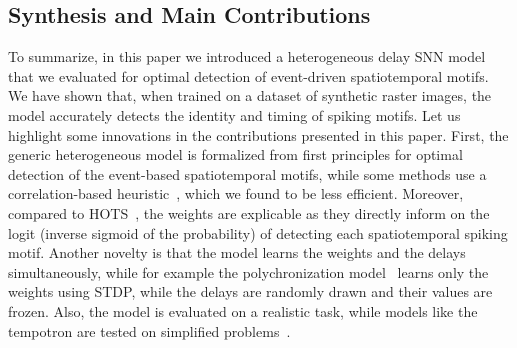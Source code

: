 \documentclass[runningheads]{llncs}
\begin{document}
\subsection{Synthesis and Main Contributions}
To summarize, in this paper we introduced a heterogeneous delay SNN model that we evaluated for optimal detection of event-driven spatiotemporal motifs. We have shown that, when trained on a dataset of synthetic raster images, the model accurately detects the identity and timing of spiking motifs. Let us highlight some innovations in the contributions presented in this paper. First, the generic heterogeneous model is formalized from first principles for optimal detection of the event-based spatiotemporal motifs, while some methods use a correlation-based heuristic~\cite{ghosh_spatiotemporal_2019,yu_stsc-snn_2022}, which we found to be less efficient. Moreover, compared to HOTS~\cite{lagorce_hots_2017}, the weights are explicable as they directly inform on the logit (inverse sigmoid of the probability) of detecting each spatiotemporal spiking motif. Another novelty is that the model learns the weights and the delays simultaneously, while for example the polychronization model~\cite{izhikevich_polychronization_2006} learns only the weights using STDP, while the delays are randomly drawn and their values are frozen. Also, the model is evaluated on a realistic task, while models like the tempotron are tested on simplified problems~\cite{gutig_tempotron_2006}. 
\end{document}
